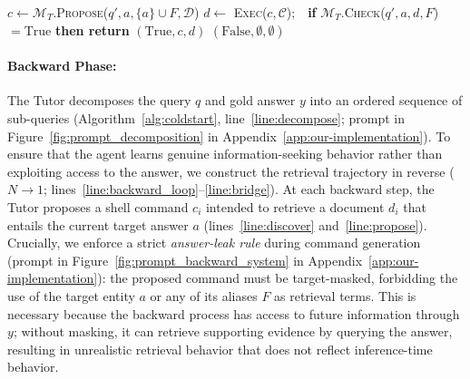 \documentclass{llmxive}
\begin{document}
\begin{algorithm*}[!t]
\begin{algorithmic}[1]
\Statex
{}  \label{line:func_discover}
     \label{line:refine_loop}
        \State $c \gets \mathcal{M}_{T}.$\textsc{Propose}($q', a, \{a\} \cup F, \mathcal{D}$)  \label{line:propose}
        \State $d \gets$ \textsc{Exec}($c, \mathcal{C}$);\ \ \textbf{if} $\mathcal{M}_{T}.$\textsc{Check}($q', a, d, F$) $= \mathrm{True}$ \textbf{then return} $(\mathrm{True}, c, d)$ \label{line:exec_check}
    \EndFor
    \State \Return $(\mathrm{False}, \emptyset, \emptyset)$ \label{line:return_fail}
\EndFunction
\end{algorithmic}
\end{algorithm*}

\paragraph{Backward Phase:}

The Tutor decomposes the query $q$ and gold answer $y$ into an ordered sequence of sub-queries (Algorithm~\ref{alg:coldstart}, line~\ref{line:decompose}; prompt in Figure~\ref{fig:prompt_decomposition} in Appendix~\ref{app:our-implementation}). To ensure that the agent learns genuine information-seeking behavior rather than exploiting access to the answer, we construct the retrieval trajectory in reverse ($N \rightarrow 1$; lines~\ref{line:backward_loop}--\ref{line:bridge}). At each backward step, the Tutor proposes a shell command $c_i$ intended to retrieve a document $d_i$ that entails the current target answer $a$ (lines~\ref{line:discover} and~\ref{line:propose}). Crucially, we enforce a strict \textit{answer-leak rule} during command generation (prompt in Figure~\ref{fig:prompt_backward_system} in Appendix~\ref{app:our-implementation}): the proposed command must be target-masked, forbidding the use of the target entity $a$ or any of its aliases $F$ as retrieval terms. This is necessary because the backward process has access to future information through $y$; without masking, it can retrieve supporting evidence by querying the answer, resulting in unrealistic retrieval behavior that does not reflect inference-time behavior. 
\end{document}
